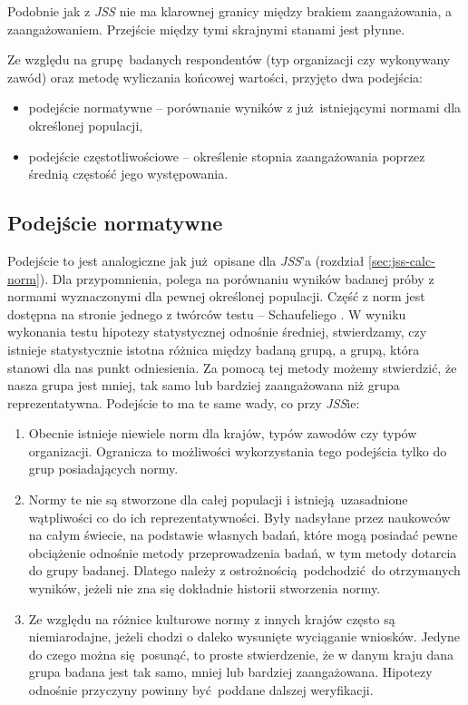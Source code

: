 Podobnie jak z \emph{JSS} nie ma klarownej granicy między brakiem zaangażowania, a zaangażowaniem. Przejście między tymi skrajnymi stanami jest płynne. 

Ze względu na grupę badanych respondentów (typ organizacji czy wykonywany zawód) oraz metodę wyliczania końcowej wartości, przyjęto dwa podejścia:
\begin{itemize}
\item podejście normatywne -- porównanie wyników z już istniejącymi normami dla określonej populacji,
\item podejście częstotliwościowe -- określenie stopnia zaangażowania poprzez średnią częstość jego występowania.
\end{itemize}
\subsection{Podejście normatywne}
Podejście to jest analogiczne jak już opisane dla \emph{JSS}'a (rozdział \ref{sec:jss-calc-norm}). Dla przypomnienia, polega na porównaniu wyników badanej próby z normami wyznaczonymi dla pewnej określonej populacji. Część z norm jest dostępna na stronie jednego z twórców testu -- Schaufeliego \cite{web:uwes-norms}. W wyniku wykonania testu hipotezy statystycznej odnośnie średniej, stwierdzamy, czy istnieje statystycznie istotna różnica między badaną grupą, a grupą, która stanowi
dla nas punkt odniesienia. Za pomocą tej metody możemy stwierdzić, że nasza grupa jest mniej, tak samo lub bardziej zaangażowana niż grupa reprezentatywna. Podejście to ma te same wady, co przy \emph{JSS}ie:
\begin{enumerate}
\item Obecnie istnieje niewiele norm dla krajów, typów zawodów czy typów organizacji. Ogranicza to możliwości wykorzystania tego podejścia tylko do grup posiadających normy.
\item Normy te nie są stworzone dla całej populacji i istnieją uzasadnione wątpliwości co do ich reprezentatywności. Były nadsyłane przez naukowców na całym świecie, na podstawie własnych badań, które mogą posiadać pewne obciążenie odnośnie metody przeprowadzenia badań, w tym metody dotarcia do grupy badanej. Dlatego należy z ostrożnością podchodzić do otrzymanych wyników, jeżeli nie zna się dokładnie historii stworzenia normy.
\item Ze względu na różnice kulturowe normy z innych krajów często są niemiarodajne, jeżeli chodzi o daleko wysunięte wyciąganie wniosków. Jedyne do czego można się posunąć, to proste stwierdzenie, że w danym kraju dana grupa badana jest tak samo, mniej lub bardziej zaangażowana. Hipotezy odnośnie przyczyny powinny być poddane dalszej weryfikacji.
\end{enumerate}

